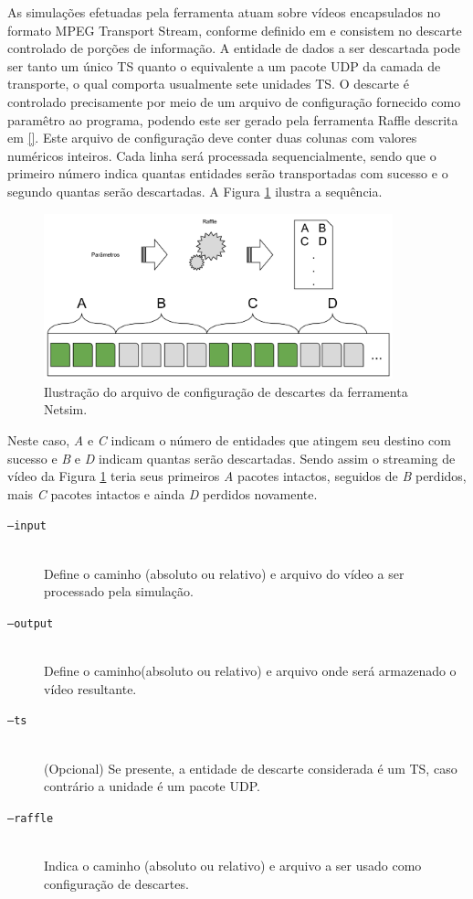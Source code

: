As simulações efetuadas pela ferramenta atuam sobre vídeos encapsulados no formato MPEG Transport Stream, conforme definido em \cite{} %
e consistem no descarte controlado de porções de informação. 
A entidade de dados a ser descartada pode ser tanto um único TS quanto o equivalente a um pacote UDP da camada de transporte, o qual comporta usualmente sete unidades TS.
O descarte é controlado precisamente por meio de um arquivo de configuração fornecido como paramêtro ao programa, podendo este ser gerado pela ferramenta Raffle descrita em \ref{}. %
Este arquivo de configuração deve conter duas colunas com valores numéricos inteiros. 
Cada linha será processada sequencialmente, sendo que o primeiro número indica quantas entidades serão transportadas com sucesso e o segundo quantas serão descartadas. 
A Figura \ref{fig:netsim} ilustra a sequência.

\begin{figure}[!htb]
	\centering
	\includegraphics[width=0.9\textwidth]{./imgs/netsim.png}
	\caption{Ilustração do arquivo de configuração de descartes da ferramenta Netsim.}
	\label{fig:netsim}
\end{figure}

Neste caso, \emph{A} e \emph{C} indicam o número de entidades que atingem seu destino com sucesso e \emph{B} e \emph{D} indicam quantas serão descartadas. 
Sendo assim o streaming de vídeo da Figura \ref{fig:netsim}  teria seus primeiros \emph{A} pacotes intactos, seguidos de \emph{B} perdidos, mais \emph{C} pacotes intactos e ainda \emph{D} perdidos novamente.

\begin{description}
	\item[\texttt{--input}] \hfill \\
		Define o caminho (absoluto ou relativo) e arquivo do vídeo a ser processado pela simulação.
	\item[\texttt{--output}] \hfill \\
		Define o caminho(absoluto ou relativo) e arquivo onde será armazenado o vídeo resultante.
	\item[\texttt{--ts}] \hfill \\
		(Opcional) Se presente, a entidade de descarte considerada é um TS, caso contrário a unidade é um pacote UDP.
	\item[\texttt{--raffle}] \hfill \\
		Indica o caminho (absoluto ou relativo) e arquivo a ser usado como configuração de descartes.
\end{description}



